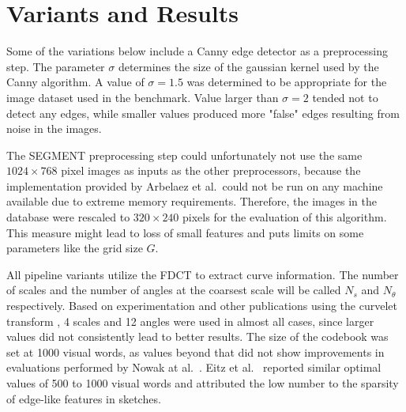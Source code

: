 \section{Variants and Results}\label{sec:results}

Some of the variations below include a Canny edge detector as a preprocessing
step. The parameter $\sigma$ determines the size of the gaussian kernel used by
the Canny algorithm. A value of $\sigma = 1.5$ was determined to be appropriate
for the image dataset used in the benchmark. Value larger than $\sigma = 2$
tended not to detect any edges, while smaller values produced more "false"
edges resulting from noise in the images.

The SEGMENT preprocessing step could unfortunately not use the same $1024
\times 768$ pixel images as inputs as the other preprocessors, because the
implementation provided by Arbelaez et al.\ could not be run on any machine
available due to extreme memory requirements. Therefore, the images in the
database were rescaled to $320 \times 240$ pixels for the evaluation of this
algorithm. This measure might lead to loss of small features and puts limits on
some parameters like the grid size $G$.

All pipeline variants utilize the FDCT to extract curve information. The number
of scales and the number of angles at the coarsest scale will be called $N_s$
and $N_{\theta}$ respectively. Based on experimentation and other publications
using the curvelet transform \autocite{mandal_curvelet_2009}
\autocite{guha_curvelet_????}, 4 scales and 12 angles were used in almost all
cases, since larger values did not consistently lead to better results. The
size of the codebook was set at 1000 visual words, as values beyond that did
not show improvements in evaluations performed by Nowak at al.\
\autocite{nowak_sampling_2006}. Eitz et al.\ \autocite{eitz_sketch-based_2010}
reported similar optimal values of 500 to 1000 visual words and attributed the
low number to the sparsity of edge-like features in sketches.



